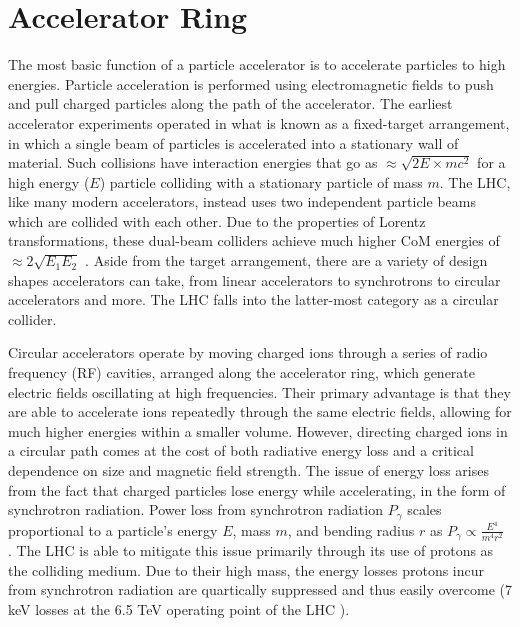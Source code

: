 \section{Accelerator Ring}

    The most basic function of a particle accelerator is to accelerate particles to high energies.
    Particle acceleration is performed using electromagnetic fields to push and pull charged particles along the path of the accelerator.
    The earliest accelerator experiments operated in what is known as a fixed-target arrangement,
        in which a single beam of particles is accelerated into a stationary wall of material.
    Such collisions have interaction energies that go as $\approx \sqrt{2 E \times m c^2}$ for a high energy ($E$) particle colliding with a stationary particle of mass $m$.
    The LHC, like many modern accelerators, instead uses two independent particle beams which are collided with each other.
    Due to the properties of Lorentz transformations, these dual-beam colliders achieve much higher CoM energies of $\approx 2 \sqrt{E_1 E_2}$ \cite{modern_and_future_colliders}.
    Aside from the target arrangement, there are a variety of design shapes accelerators can take, from linear accelerators to synchrotrons to circular accelerators and more.
    The LHC falls into the latter-most category as a circular collider.

    Circular accelerators operate by moving charged ions through a series of radio frequency (RF) cavities,
        arranged along the accelerator ring,
        which generate electric fields oscillating at high frequencies.
    Their primary advantage is that they are able to accelerate ions repeatedly through the same electric fields, allowing for much higher energies within a smaller volume.
    However, directing charged ions in a circular path comes at the cost of both radiative energy loss and a critical dependence on size and magnetic field strength.
    The issue of energy loss arises from the fact that charged particles lose energy while accelerating, in the form of synchrotron radiation.
    Power loss from synchrotron radiation $P_\gamma$ scales proportional to a particle's energy $E$, mass $m$,
        and bending radius $r$ as $P_\gamma \propto \frac{E^4}{m^4 r^2}$ \cite{2007_Book_ParticleAcceleratorPhysics}.
    The LHC is able to mitigate this issue primarily through its use of protons as the colliding medium.
    Due to their high mass, the energy losses protons incur from synchrotron radiation are quartically suppressed
        and thus easily overcome (7 keV losses at the 6.5 TeV operating point of the LHC \cite{lhc_machine}). %

